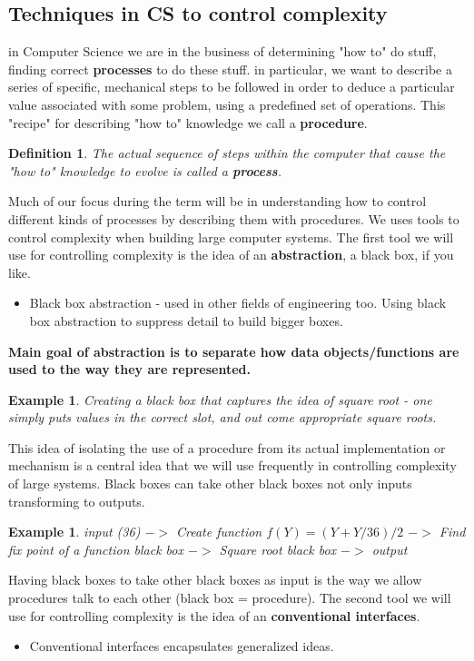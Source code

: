 \documentclass[a4paper,twoside]{article}
\newtheorem{example}[theorem]{Example}
\newtheorem{definition}[theorem]{Definition}
\numberwithin{equation}{section}
\begin{document}
\subsection{Techniques in CS to control complexity}
\label{Control complexity}
in Computer Science we are in the business of determining "how to" do stuff, finding correct
\textbf{processes} to do these stuff. in particular, we want to describe a series of specific,
mechanical steps to be followed in order to deduce a particular value associated with some problem,
using a predefined set of operations. This "recipe" for describing "how to" knowledge we call a
\textbf{procedure}.
\begin{definition}
    The actual sequence of steps within the computer that cause the "how to" knowledge to evolve is
    called a \textbf{process}.
\end{definition}
Much of our focus during the term will be in understanding how to control
different kinds of processes by describing them with procedures.
We uses tools to control complexity when building large computer systems. The first tool we will
use for controlling complexity is the idea of an \textbf{abstraction}, a black box, if you like.
\begin{itemize}
    \item Black box abstraction - used in other fields of engineering too. Using black box
          abstraction to suppress detail to build bigger boxes.
\end{itemize}
\textbf{Main goal of abstraction is to separate how data objects/functions are used to the way they 
are represented.}
\begin{example}
    Creating a black box that captures the idea of square root - one simply puts values in the
    correct slot, and out come appropriate square roots.
\end{example}
This idea of isolating the use of a procedure from its actual implementation or mechanism is a
central idea that we will use frequently in controlling complexity of large systems.
Black boxes can take other black boxes not only inputs transforming to outputs.
\begin{example}
    input (36) $->$ Create function $f(Y)= (Y + Y/36)/2$ $->$ Find fix point of a function black
    box $->$ Square root black box $->$ output
\end{example}
Having black boxes to take other black boxes as input is the way we allow procedures talk to each
other (black box  = procedure).
The second tool we will use for controlling complexity is the idea of an \textbf{conventional interfaces}.
\begin{itemize}
    \item Conventional interfaces encapsulates generalized ideas.
\end{itemize}
\end{document}
